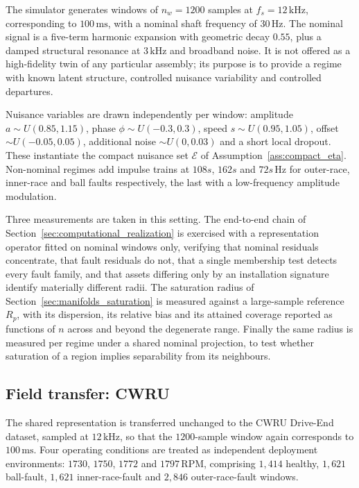 \documentclass[a4paper]{cas-sc}
\newcommand{\EtaSpace}{\ensuremath{\mathcal{E}}}
\begin{document}
The simulator generates windows of \(n_w=1200\) samples at
\(f_s=12\,\mathrm{kHz}\), corresponding to \(100\,\mathrm{ms}\), with a
nominal shaft frequency of \(30\,\mathrm{Hz}\). The nominal signal is a
five-term harmonic expansion with geometric decay \(0.55\), plus a damped
structural resonance at \(3\,\mathrm{kHz}\) and broadband noise. It is not
offered as a high-fidelity twin of any particular assembly; its purpose is to
provide a regime with known latent structure, controlled nuisance variability
and controlled departures.

Nuisance variables are drawn independently per window:
amplitude \(a\sim U(0.85,1.15)\), phase \(\phi\sim U(-0.3,0.3)\), speed
\(s\sim U(0.95,1.05)\), offset \(\sim U(-0.05,0.05)\), additional noise
\(\sim U(0,0.03)\) and a short local dropout. These instantiate the compact
nuisance set \(\EtaSpace\) of Assumption~\ref{ass:compact_eta}. Non-nominal
regimes add impulse trains at \(108s\), \(162s\) and \(72s\,\mathrm{Hz}\) for
outer-race, inner-race and ball faults respectively, the last with a
low-frequency amplitude modulation.

Three measurements are taken in this setting. The end-to-end chain of
Section~\ref{sec:computational_realization} is exercised with a
representation operator fitted on nominal windows only, verifying that
nominal residuals concentrate, that fault residuals do not, that a single
membership test detects every fault family, and that assets differing only by
an installation signature identify materially different radii. The saturation
radius of Section~\ref{sec:manifolds_saturation} is measured against a
large-sample reference \(R_p\), with its dispersion, its relative bias and its
attained coverage reported as functions of \(n\) across and beyond the
degenerate range. Finally the same radius is measured per regime under a
shared nominal projection, to test whether saturation of a region implies
separability from its neighbours.

\subsection{Field transfer: CWRU}
\label{subsec:design_cwru}

The shared representation is transferred unchanged to the CWRU Drive-End
dataset, sampled at \(12\,\mathrm{kHz}\), so that the \(1200\)-sample window
again corresponds to \(100\,\mathrm{ms}\). Four operating conditions are
treated as independent deployment environments: \(1730\), \(1750\), \(1772\)
and \(1797\,\mathrm{RPM}\), comprising \(1{,}414\) healthy, \(1{,}621\)
ball-fault, \(1{,}621\) inner-race-fault and \(2{,}846\) outer-race-fault
windows.
\end{document}
